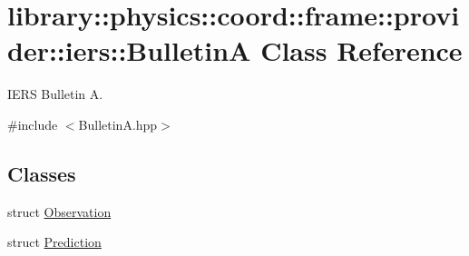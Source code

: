 \hypertarget{classlibrary_1_1physics_1_1coord_1_1frame_1_1provider_1_1iers_1_1_bulletin_a}{}\section{library\+:\+:physics\+:\+:coord\+:\+:frame\+:\+:provider\+:\+:iers\+:\+:BulletinA Class Reference}
\label{classlibrary_1_1physics_1_1coord_1_1frame_1_1provider_1_1iers_1_1_bulletin_a}


I\+E\+RS Bulletin A.  




{\ttfamily \#include $<$Bulletin\+A.\+hpp$>$}

\subsection*{Classes}
\begin{DoxyCompactItemize}
\item 
struct \hyperlink{structlibrary_1_1physics_1_1coord_1_1frame_1_1provider_1_1iers_1_1_bulletin_a_1_1_observation}{Observation}
\item 
struct \hyperlink{structlibrary_1_1physics_1_1coord_1_1frame_1_1provider_1_1iers_1_1_bulletin_a_1_1_prediction}{Prediction}
\end{DoxyCompactItemize}
